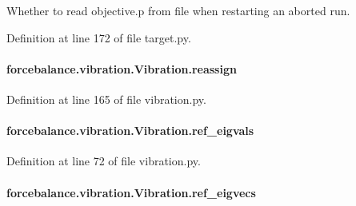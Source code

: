 Whether to read objective.\-p from file when restarting an aborted run. 



Definition at line 172 of file target.\-py.

\hypertarget{classforcebalance_1_1vibration_1_1Vibration_a6dc3e340d09d4adc415eee905c75b6cc}{
\paragraph[{reassign}]{\setlength{\rightskip}{0pt plus 5cm}forcebalance.\-vibration.\-Vibration.\-reassign\hspace{0.3cm}{\ttfamily [inherited]}}}\label{classforcebalance_1_1vibration_1_1Vibration_a6dc3e340d09d4adc415eee905c75b6cc}


Definition at line 165 of file vibration.\-py.

\hypertarget{classforcebalance_1_1vibration_1_1Vibration_ab9913cb05e66e53a5781237baf9ea2e1}{
\paragraph[{ref\-\_\-eigvals}]{\setlength{\rightskip}{0pt plus 5cm}forcebalance.\-vibration.\-Vibration.\-ref\-\_\-eigvals\hspace{0.3cm}{\ttfamily [inherited]}}}\label{classforcebalance_1_1vibration_1_1Vibration_ab9913cb05e66e53a5781237baf9ea2e1}


Definition at line 72 of file vibration.\-py.

\hypertarget{classforcebalance_1_1vibration_1_1Vibration_ae9c5479bd3b01ecb3d2d40a9487ccac5}{
\paragraph[{ref\-\_\-eigvecs}]{\setlength{\rightskip}{0pt plus 5cm}forcebalance.\-vibration.\-Vibration.\-ref\-\_\-eigvecs\hspace{0.3cm}{\ttfamily [inherited]}}}\label{classforcebalance_1_1vibration_1_1Vibration_ae9c5479bd3b01ecb3d2d40a9487ccac5}


